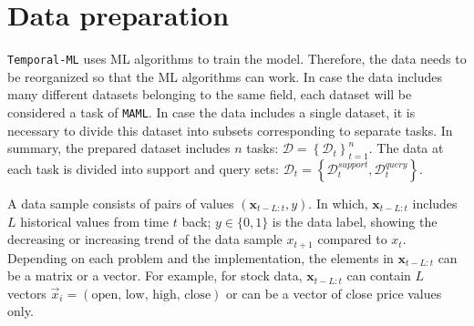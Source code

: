 \section{Data preparation}
\label{sec:data_prep}


\verb|Temporal-ML| uses ML algorithms to train the model. Therefore, the data needs to be reorganized so that the ML algorithms can work. In case the data includes many different datasets belonging to the same field, each dataset will be considered a task of \verb|MAML|. In case the data includes a single dataset, it is necessary to divide this dataset into subsets corresponding to separate tasks. In summary, the prepared dataset includes $n$ tasks: $\mathcal{D} = \left\{ \mathcal{D}_t \right\}_{t=1}^{n}$. The data at each task is divided into support and query sets: $\mathcal{D}_t = \left\{ \mathcal{D}_t^{support}, \mathcal{D}_t^{query} \right\}$.


A data sample consists of pairs of values $(\mathbf{x}_{t-L:t}, y)$. In which, $\mathbf{x}_{t-L:t}$ includes $L$ historical values from time $t$ back; $y\in \{0,1\}$ is the data label, showing the decreasing or increasing trend of the data sample $x_{t+1}$ compared to $x_{t}$. Depending on each problem and the implementation, the elements in $\mathbf{x}_{t-L:t}$ can be a matrix or a vector. For example, for stock data, $\mathbf{x}_{t-L:t}$ can contain $L$ vectors $\vec x_i = (\text{open, low, high, close})$ or can be a vector of close price values only.

